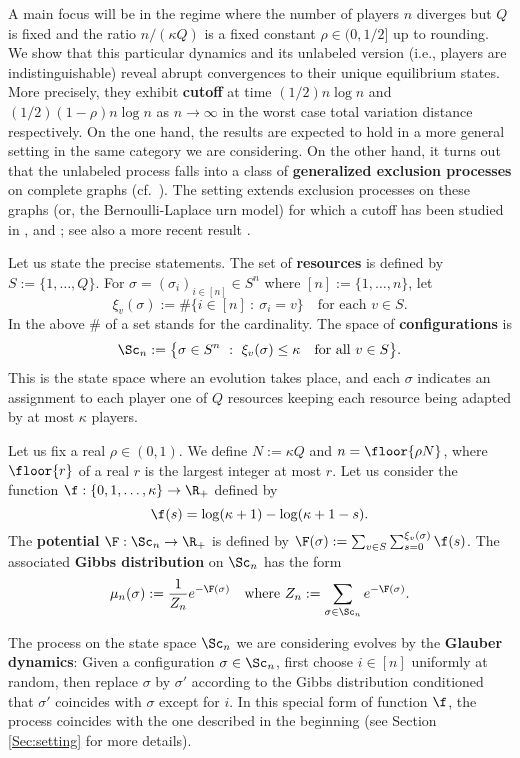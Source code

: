 \documentclass[12pt, reqno]{amsart}
\begin{document}
A main focus will be in the regime where the number of players $n$ diverges but $Q$ is fixed and the ratio $n/(\kappa Q)$ is a fixed constant $\rho \in (0, 1/2]$ up to rounding.
We show that this particular dynamics and its unlabeled version (i.e., players are indistinguishable) reveal abrupt convergences to their unique equilibrium states.
More precisely,
they exhibit {\bf cutoff} at time $(1/2)n\log n$ and $(1/2)(1-\rho)n\log n$ as $n \to \infty$
in the worst case total variation distance respectively.
On the one hand, 
the results are expected to hold in a more general setting in the same category we are considering.
On the other hand, 
it turns out that the unlabeled process falls into a class of {\bf generalized exclusion processes} on complete graphs (cf.\ \cite[Section 4, Chapter 2]{KipnisLandim}).
The setting extends exclusion processes on these graphs (or, the Bernoulli-Laplace urn model)
for which a cutoff has been studied in \cite{DiaconisShahshahaniBernoulliLaplace},
\cite{LacoinLeblond} and \cite{PatkoPete}; see also a more recent result \cite{Olesker-Taylor-Schmid}.



Let us state the precise statements.
The set of {\bf resources} is defined by $S:=\{1, \dots, Q\}$.
For $\sigma=(\sigma_i)_{i\in [n]}\in S^n$ where $[n]:=\{1, \dots, n\}$,
let
\[
\xi_v(\sigma):=\#\big\{i \in [n] \ : \ \sigma_i=v\big\} \quad \text{for each $v \in S$}.
\]
In the above $\#$ of a set stands for the cardinality.
The space of {\bf configurations} is 
\[
\Sc_n:=\big\{\sigma \in S^n \ : \ \xi_v(\sigma) \le \kappa \quad \text{for all $v \in S$}\big\}.
\]
This is the state space where an evolution takes place,
and each $\sigma$ indicates an assignment to each player one of $Q$ resources keeping each resource being adapted by at most $\kappa$ players.

Let us fix a real $\rho \in (0, 1)$.
We define $N:=\kappa Q$ and $n=\floor{\rho N}$,
where $\floor{r}$ of a real $r$ is the largest integer at most $r$. 
Let us consider the function $\f:\{0, 1, \dots, \kappa\}\to \R_+$ defined by
\[
\f(s)=\log(\kappa+1)-\log(\kappa+1-s).
\]
The {\bf potential} $\F:\Sc_n\to \R_+$ is defined by $\F(\sigma):=\sum_{v \in S}\sum_{s=0}^{\xi_v(\sigma)}\f(s)$.
The associated {\bf Gibbs distribution} on $\Sc_n$ has the form
\[
\mu_n(\sigma):=\frac{1}{Z_n}e^{-\F(\sigma)} \quad \text{where $Z_n:=\sum_{\sigma \in \Sc_n}e^{-\F(\sigma)}$}.
\]


The process on the state space $\Sc_n$ we are considering evolves by the {\bf Glauber dynamics}:
Given a configuration $\sigma \in \Sc_n$,
first choose $i \in [n]$ uniformly at random,
then replace $\sigma$ by $\sigma'$ according to the Gibbs distribution conditioned that $\sigma'$ coincides with $\sigma$ except for $i$.
In this special form of function $\f$, 
the process coincides with the one described in the beginning (see Section \ref{Sec:setting} for more details).
\end{document}

